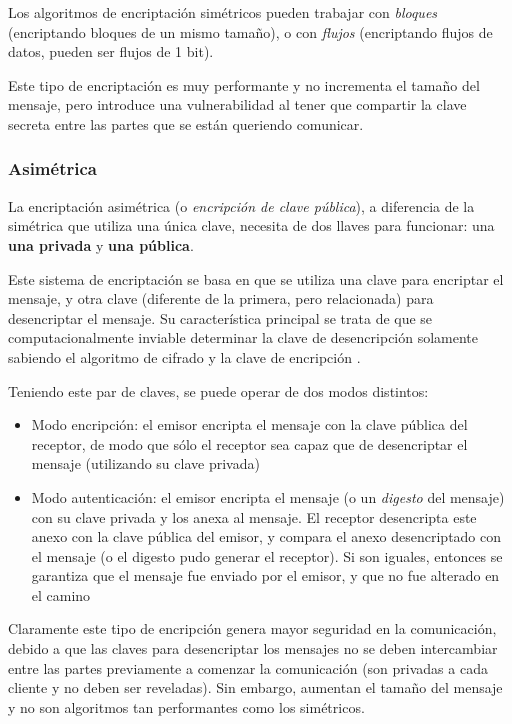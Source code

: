 Los algoritmos de encriptación simétricos pueden trabajar con \emph{bloques} (encriptando bloques de un mismo tamaño), o con \emph{flujos} (encriptando flujos de datos, pueden ser flujos de 1 bit).  

Este tipo de encriptación es muy performante y no incrementa el tamaño del mensaje, pero introduce una vulnerabilidad al tener que compartir la clave secreta entre las partes que se están queriendo comunicar.

\subsubsection{Asimétrica}

La encriptación asimétrica (o \emph{encripción de clave pública}), a diferencia de la simétrica que utiliza una única clave, necesita de dos llaves para funcionar: una \textbf{una privada} y \textbf{una pública}.  

Este sistema de encriptación se basa en que se utiliza una clave para encriptar el mensaje, y otra clave (diferente de la primera, pero relacionada) para desencriptar el mensaje. Su característica principal se trata de que se computacionalmente inviable determinar la clave de desencripción solamente sabiendo el algoritmo de cifrado y la clave de encripción \autocite{StallingsPublicKeyPrinciples}.

Teniendo este par de claves, se puede operar de dos modos distintos:

\begin{itemize}
    \item Modo encripción: el emisor encripta el mensaje con la clave pública del receptor, de modo que sólo el receptor sea capaz que de desencriptar el mensaje (utilizando su clave privada)
    \item Modo autenticación: el emisor encripta el mensaje (o un \emph{digesto} del mensaje) con su clave privada y los anexa al mensaje. El receptor desencripta este anexo con la clave pública del emisor, y compara el anexo desencriptado con el mensaje (o el digesto pudo generar el receptor). Si son iguales, entonces se garantiza que el mensaje fue enviado por el emisor, y que no fue alterado en el camino
\end{itemize}

Claramente este tipo de encripción genera mayor seguridad en la comunicación, debido a que las claves para desencriptar los mensajes no se deben intercambiar entre las partes previamente a comenzar la comunicación (son privadas a cada cliente y no deben ser reveladas). Sin embargo, aumentan el tamaño del mensaje y no son algoritmos tan performantes como los simétricos.

